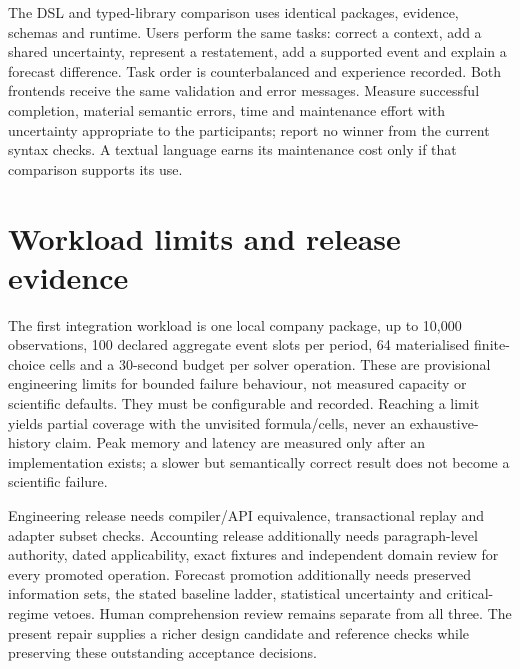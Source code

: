 The DSL and typed-library comparison uses identical packages, evidence,
schemas and runtime. Users perform the same tasks: correct a context, add a
shared uncertainty, represent a restatement, add a supported event and explain
a forecast difference. Task order is counterbalanced and experience recorded.
Both frontends receive the same validation and error messages. Measure
successful completion, material semantic errors, time and maintenance effort
with uncertainty appropriate to the participants; report no winner from the
current syntax checks. A textual language earns its maintenance cost only if
that comparison supports its use.

\section{Workload limits and release evidence}

The first integration workload is one local company package, up to 10,000
observations, 100 declared aggregate event slots per period, 64 materialised
finite-choice cells and a 30-second budget per solver operation. These are
provisional engineering limits for bounded failure behaviour, not measured
capacity or scientific defaults. They must be configurable and recorded.
Reaching a limit yields partial coverage with the unvisited formula/cells,
never an exhaustive-history claim. Peak memory and latency are measured only
after an implementation exists; a slower but semantically correct result
does not become a scientific failure.

Engineering release needs compiler/API equivalence, transactional replay and
adapter subset checks. Accounting release additionally needs paragraph-level
authority, dated applicability, exact fixtures and independent domain review
for every promoted operation. Forecast promotion additionally needs preserved
information sets, the stated baseline ladder, statistical uncertainty and
critical-regime vetoes. Human comprehension review remains separate from all
three. The present repair supplies a richer design candidate and reference
checks while preserving these outstanding acceptance decisions.
